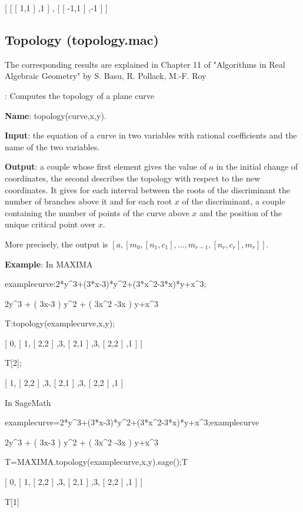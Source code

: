 \documentclass{article}
\begin{document}
[ [ [ 1,1 ] ,1 ] , [ [ -1,1 ] ,-1 ] ]
  
  
\subsection{Topology (topology.mac)}

The corresponding results are explained in Chapter 11 of "Algorithms in Real
Algebraic Geometry" by S. Basu, R. Pollack, M.-F. Roy

:
  Computes the topology of a plane curve
  
{\bf Name}: topology(curve,x,y).
  
{\bf Input}: the equation of a curve in two variables with rational coefficients
  and the name of the two variables.
  
{\bf Output}: a couple whose first element gives the value of $a$ in the initial
  change of coordinates, the second describes the topology with respect to the
  new coordinates. It gives for each interval between the roots of the
  discriminant the number of branches above it and for each root $x$ of the
  discriminant, a couple containing the number of points of the curve above
  $x$ and the position of the unique critical point over $x$.
  
  More precisely, the output is $[ a, [ m_{0} , [ n_{1} ,c_{1} ] , \ldots
  ,m_{r-1} , [ n_{r} ,c_{r} ] ,m_{r} ] ]$.
  
 {\bf Example}: In MAXIMA
  
   examplecurve:2*y\^{}3+(3*x-3)*y\^{}2+(3*x\^{}2-3*x)*y+x\^{}3;
   
   2y\^{}{3} + ( 3x-3 ) y\^{}{2} + ( 3x\^{}{2} -3x ) y+x\^{}{3}
   
   T:topology(examplecurve,x,y);
   
   [ 0, [ 1, [ 2,2 ] ,3, [ 2,1 ] ,3, [ 2,2 ] ,1 ] ]
   
   T[2];
   
   [ 1, [ 2,2 ] ,3, [ 2,1 ] ,3, [ 2,2 ] ,1 ]
   
 \noindent In SageMath
 
examplecurve=2*y\^{}3+(3*x-3)*y\^{}2+(3*x\^{}2-3*x)*y+x\^{}3;examplecurve
   
   2y\^{}{3} + ( 3x-3 ) y\^{}{2} + ( 3x\^{}{2} -3x ) y+x\^{}{3}
   
   T=MAXIMA.topology(examplecurve,x,y).sage();T
   
   [ 0, [ 1, [ 2,2 ] ,3, [ 2,1 ] ,3, [ 2,2 ] ,1 ] ]
   
   T[1]
   
\end{document}
